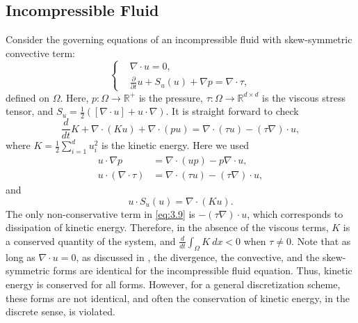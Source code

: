 \subsection{Incompressible Fluid} \label{sec:skew.2}
Consider the governing equations of an incompressible fluid with skew-symmetric convective term:
\begin{equation} \label{eq:3.8}
	\left\{
	\begin{aligned}
	&\nabla \cdot u = 0, \\
	&\frac{\partial}{\partial t} u + S_{u}(u) + \nabla p = \nabla \cdot \tau,
	\end{aligned}
	\right.
\end{equation}
defined on $\Omega$. Here, $p: \Omega \to \mathbb R^+$ is the pressure, $\tau: \Omega \to \mathbb R^{d\times d}$ is the viscous stress tensor, and $S_u = \frac 1 2 ([ \nabla \cdot u] + u\cdot \nabla)$. It is straight forward to check
\begin{equation} \label{eq:3.9}
	\frac{d}{dt} K + \nabla \cdot (Ku) + \nabla \cdot (pu)= \nabla \cdot (\tau u) - (\tau \nabla)\cdot u,
\end{equation}
where $K = \frac 1 2 \sum_{i=1}^d u_i^2 $ is the kinetic energy. Here we used 
\begin{equation} \label{eq:3.10}
	\begin{aligned}
	u\cdot \nabla p &= \nabla \cdot (up) - p\nabla \cdot u, \\
	u \cdot (\nabla \cdot \tau) &= \nabla \cdot (\tau u) - (\tau \nabla)\cdot u,
	\end{aligned} 
\end{equation}
and
\begin{equation} \label{eq:3.11}
	u\cdot S_{u}(u) = \nabla \cdot(Ku).
\end{equation}
The only non-conservative term in \eqref{eq:3.9} is $-(\tau \nabla)\cdot u$, which corresponds to dissipation of kinetic energy. Therefore, in the absence of the viscous terms, $K$ is a conserved quantity of the system, and $\frac d {dt} \int_{\Omega} K \ dx <0$ when $\tau\neq 0$. Note that as long as $\nabla \cdot u = 0$, as discussed in , the divergence, the convective, and the skew-symmetric forms are identical for the incompressible fluid equation. Thus, kinetic energy is conserved for all forms. However, for a general discretization scheme, these forms are not identical, and often the conservation of kinetic energy, in the discrete sense, is violated.


